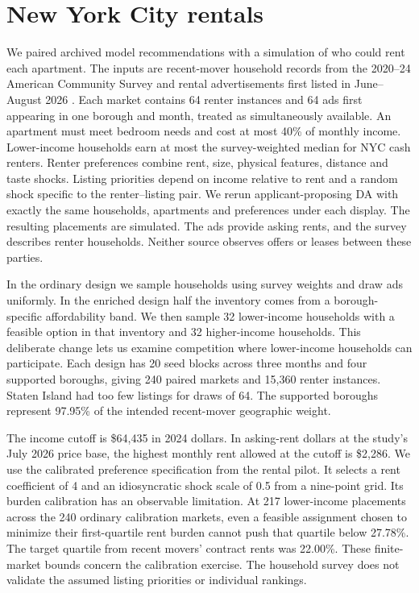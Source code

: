 \section{New York City rentals}\label{sec:twonyc}
We paired archived model recommendations with a simulation of who could rent each apartment. The inputs are recent-mover household records from the 2020--24 American Community Survey and rental advertisements first listed in June--August 2026 \citep{acs,firstmover}. Each market contains 64 renter instances and 64 ads first appearing in one borough and month, treated as simultaneously available. An apartment must meet bedroom needs and cost at most 40\% of monthly income. Lower-income households earn at most the survey-weighted median for NYC cash renters. Renter preferences combine rent, size, physical features, distance and taste shocks. Listing priorities depend on income relative to rent and a random shock specific to the renter--listing pair. We rerun applicant-proposing DA with exactly the same households, apartments and preferences under each display. The resulting placements are simulated. The ads provide asking rents, and the survey describes renter households. Neither source observes offers or leases between these parties.

In the ordinary design we sample households using survey weights and draw ads uniformly. In the enriched design half the inventory comes from a borough-specific affordability band. We then sample 32 lower-income households with a feasible option in that inventory and 32 higher-income households. This deliberate change lets us examine competition where lower-income households can participate. Each design has 20 seed blocks across three months and four supported boroughs, giving 240 paired markets and 15,360 renter instances. Staten Island had too few listings for draws of 64. The supported boroughs represent 97.95\% of the intended recent-mover geographic weight.

The income cutoff is \$64,435 in 2024 dollars. In asking-rent dollars at the study's July 2026 price base, the highest monthly rent allowed at the cutoff is \$2,286. We use the calibrated preference specification from the rental pilot. It selects a rent coefficient of 4 and an idiosyncratic shock scale of 0.5 from a nine-point grid. Its burden calibration has an observable limitation. At 217 lower-income placements across the 240 ordinary calibration markets, even a feasible assignment chosen to minimize their first-quartile rent burden cannot push that quartile below 27.78\%. The target quartile from recent movers' contract rents was 22.00\%. These finite-market bounds concern the calibration exercise. The household survey does not validate the assumed listing priorities or individual rankings.

